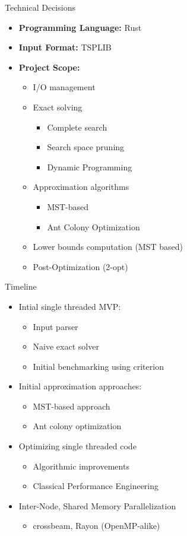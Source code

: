\begin{frame}[t]{Technical Decisions}
\begin{itemize}
\item \textbf{Programming Language:} Rust
\pause
\item \textbf{Input Format:} TSPLIB
\pause
\item \textbf{Project Scope:}
\begin{itemize}
\pause
\item I/O management
\pause
\item Exact solving
\begin{itemize}
\item Complete search
\item Search space pruning
\item Dynamic Programming
\end{itemize}
\pause
\item Approximation algorithms
\begin{itemize}
\item MST-based
\item Ant Colony Optimization
\end{itemize}
\pause
\item Lower bounds computation (MST based)
\pause
\item Post-Optimization (2-opt)
\end{itemize}
\end{itemize}
\end{frame}

\begin{frame}[t]{Timeline}
  \pause
\begin{itemize}
  \item Intial single threaded MVP:
  \begin{itemize}
    \item Input parser
    \item Naive exact solver
    \item Initial benchmarking using criterion
  \end{itemize}
  \pause
  \item Initial approximation approaches:
  \begin{itemize}
    \item MST-based approach
    \item Ant colony optimization
  \end{itemize}
  \pause
  \item Optimizing single threaded code
  \begin{itemize}
    \item Algorithmic improvements
    \item Classical Performance Engineering
  \end{itemize}
  \pause
  \item Inter-Node, Shared Memory Parallelization
  \begin{itemize}
    \item crossbeam, Rayon (OpenMP-alike)
  \end{itemize}
\end{itemize}
\end{frame}

